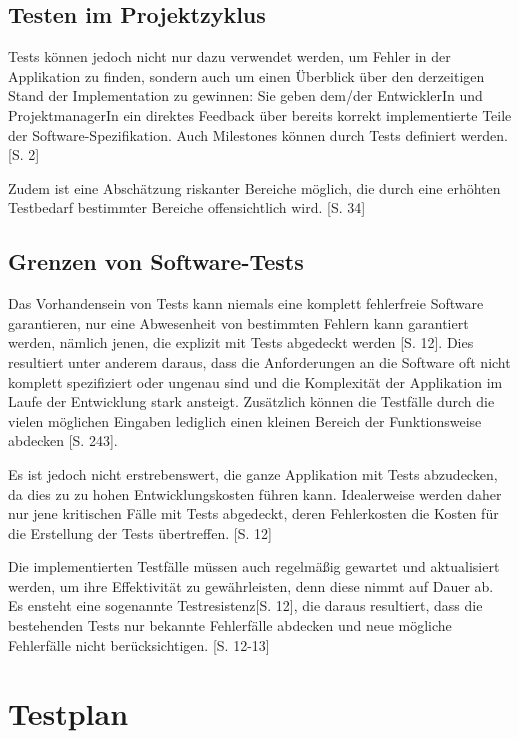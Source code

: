 \documentclass[a4paper,bibtotoc,oneside]{scrbook}
\begin{document}
\section{Testen im Projektzyklus}
Tests können jedoch nicht nur dazu verwendet werden, um Fehler in der Applikation zu finden, sondern auch um einen Überblick über den derzeitigen Stand der Implementation zu gewinnen: Sie geben dem/der EntwicklerIn und ProjektmanagerIn ein direktes Feedback über bereits korrekt implementierte Teile der Software-Spezifikation. Auch Milestones können durch Tests definiert werden. \cite{test_auto}[S. 2]

Zudem ist eine Abschätzung riskanter Bereiche möglich, die durch eine erhöhten Testbedarf bestimmter Bereiche offensichtlich wird. \cite{testing_apps_on_web}[S. 34]



\section{Grenzen von Software-Tests}
Das Vorhandensein von Tests kann niemals eine komplett fehlerfreie Software garantieren, nur eine Abwesenheit von bestimmten Fehlern kann garantiert werden, nämlich jenen, die explizit mit Tests abgedeckt werden \cite{eval_regression}[S. 12]. Dies resultiert unter anderem daraus, dass die Anforderungen an die Software oft nicht komplett spezifiziert oder ungenau sind und die Komplexität der Applikation im Laufe der Entwicklung stark ansteigt. Zusätzlich können die Testfälle durch die vielen möglichen Eingaben lediglich einen kleinen Bereich der Funktionsweise abdecken \cite{software_qual}[S. 243].

Es ist jedoch nicht erstrebenswert, die ganze Applikation mit Tests abzudecken, da dies zu zu hohen Entwicklungskosten führen kann. Idealerweise werden daher nur jene kritischen Fälle mit Tests abgedeckt, deren Fehlerkosten die Kosten für die Erstellung der Tests übertreffen. \cite{eval_regression}[S. 12]

Die implementierten Testfälle müssen auch regelmäßig gewartet und aktualisiert werden, um ihre Effektivität zu gewährleisten, denn diese nimmt auf Dauer ab. Es ensteht eine sogenannte \glqq Testresistenz\grqq\cite{eval_regression}[S. 12], die daraus resultiert, dass die bestehenden Tests nur bekannte Fehlerfälle abdecken und neue mögliche Fehlerfälle nicht berücksichtigen. \cite{eval_regression}[S. 12-13]

\chapter{Testplan}
\end{document}
